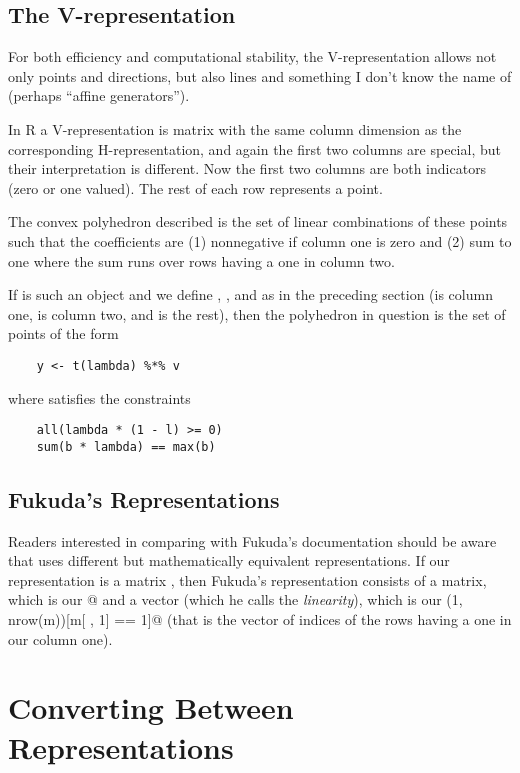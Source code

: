 \documentclass{article}
\begin{document}
\subsection{The V-representation}

For both efficiency and computational stability, the V-representation
allows not only points and directions, but also lines and something I
don't know the name of (perhaps ``affine generators'').

In R a V-representation is matrix with the same column dimension as
the corresponding H-representation, and again the first two columns
are special,
but their interpretation is different.  Now the first two columns
are both indicators (zero or one valued).  The rest of each row
represents a point.

The convex polyhedron described is the set of linear combinations of
these points such that the coefficients are (1) nonnegative if
column one is zero and (2) sum to one where the sum runs over
rows having a one in column two.

If \verb@m@ is such an object and we define \verb@v@, \verb@b@, and
\verb@l@ as in the preceding section (\verb@l@ is column one, \verb@b@ is
column two, and \verb@v@ is the rest), then the polyhedron in question
is the set of points of the form
\begin{verbatim}
    y <- t(lambda) %*% v
\end{verbatim}
where \verb@lambda@ satisfies the constraints
\begin{verbatim}
    all(lambda * (1 - l) >= 0)
    sum(b * lambda) == max(b)
\end{verbatim}

\subsection{Fukuda's Representations}

Readers interested in comparing with Fukuda's documentation should be
aware that \verb@cddlib@ uses different but mathematically equivalent
representations.
If our representation is a matrix \verb@m@, then Fukuda's representation
consists of a matrix, which is our \verb@m[ , -1]@ and a vector
(which he calls the \emph{linearity}), which is our
\verb@seq(1, nrow(m))[m[ , 1] == 1]@
(that is the vector of indices of the rows having a one in our column one).

\section{Converting Between Representations}
\end{document}
